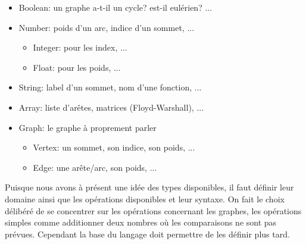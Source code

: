 \documentclass[french]{article}
\begin{document}
				\begin{itemize}
					\item Boolean: un graphe a-t-il un cycle? est-il eulérien? ...
					\item Number: poids d'un arc, indice d'un sommet, ...
					\begin{itemize}
						\item Integer: pour les index, ...
						\item Float: pour les poids, ...
					\end{itemize}
					\item String: label d'un sommet, nom d'une fonction, ...
					\item Array: liste d'arêtes, matrices (Floyd-Warshall), ...
					\item Graph: le graphe à proprement parler
					\begin{itemize}
						\item Vertex: un sommet, son indice, son poids, ...
						\item Edge: une arête/arc, son poids, ...
					\end{itemize}
				\end{itemize} 
			
				Puisque nous avons à présent une idée des types disponibles, il faut définir leur domaine ainsi que les opérations disponibles et leur syntaxe. On fait le choix délibéré de se concentrer sur les opérations concernant les graphes, les opérations simples comme additionner deux nombres où les comparaisons ne sont pas prévues. Cependant la base du langage doit permettre de les définir plus tard. 
			
\end{document}
